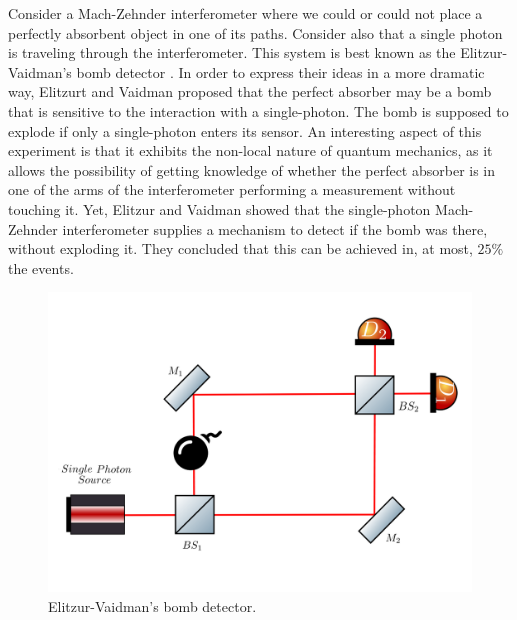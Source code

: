 \documentclass[12pt]{book}
\begin{document}
Consider a Mach-Zehnder interferometer where we could or could not place a perfectly absorbent object in one of its paths. Consider also that a single photon is traveling through the interferometer. This system is best known as the Elitzur-Vaidman's bomb detector \cite{Elitzur}. In order to express their ideas in a more dramatic way, Elitzurt and Vaidman proposed that the perfect absorber may be a bomb that is sensitive to the interaction with a single-photon. The bomb is supposed to explode if only a single-photon enters its sensor. An interesting aspect of this experiment is that it exhibits the non-local nature of quantum mechanics, as it allows the possibility of getting knowledge of whether the perfect absorber is in one of the arms of the interferometer performing a measurement without touching it. Yet, Elitzur and Vaidman showed that the single-photon Mach-Zehnder interferometer supplies a mechanism to detect if the bomb was there, without exploding it. They concluded that this can be achieved in, at most, $25\%$ the events.


\begin{figure}[t!]
\centering
\includegraphics[width=\linewidth]{images/machzenhderbomb.png}
\caption{Elitzur-Vaidman's bomb detector.}
\label{fig:bomb}
\end{figure}
\end{document}
